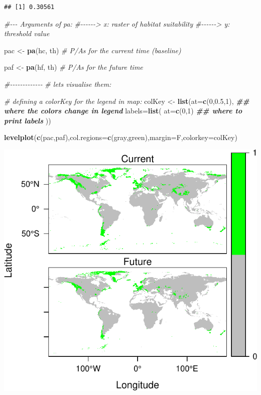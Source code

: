 \documentclass[
]{article}
\newenvironment{Shaded}{\begin{snugshade}}{\end{snugshade}}
\newcommand{\AttributeTok}[1]{\textcolor[rgb]{0.13,0.29,0.53}{#1}}
\newcommand{\CommentTok}[1]{\textcolor[rgb]{0.56,0.35,0.01}{\textit{#1}}}
\newcommand{\DecValTok}[1]{\textcolor[rgb]{0.00,0.00,0.81}{#1}}
\newcommand{\DocumentationTok}[1]{\textcolor[rgb]{0.56,0.35,0.01}{\textbf{\textit{#1}}}}
\newcommand{\FloatTok}[1]{\textcolor[rgb]{0.00,0.00,0.81}{#1}}
\newcommand{\FunctionTok}[1]{\textcolor[rgb]{0.13,0.29,0.53}{\textbf{#1}}}
\newcommand{\NormalTok}[1]{#1}
\newcommand{\OtherTok}[1]{\textcolor[rgb]{0.56,0.35,0.01}{#1}}
\newcommand{\StringTok}[1]{\textcolor[rgb]{0.31,0.60,0.02}{#1}}
\begin{document}
\begin{verbatim}
## [1] 0.30561
\end{verbatim}

\begin{Shaded}
\begin{Highlighting}[]
\CommentTok{\#{-}{-}{-} Arguments of pa:}
\CommentTok{\#{-}{-}{-}{-}{-}{-}\textgreater{} x: raster of habitat suitability}
\CommentTok{\#{-}{-}{-}{-}{-}{-}\textgreater{} y: threshold value}

\NormalTok{pac }\OtherTok{\textless{}{-}} \FunctionTok{pa}\NormalTok{(hc, th) }\CommentTok{\# P/As for the current time (baseline)}

\NormalTok{paf }\OtherTok{\textless{}{-}} \FunctionTok{pa}\NormalTok{(hf, th) }\CommentTok{\# P/As for the future time}

\CommentTok{\#{-}{-}{-}{-}{-}{-}{-}{-}{-}{-}{-}{-}{-}}
\CommentTok{\# let\textquotesingle{}s visualise them:}

\CommentTok{\# defining a colorKey for the legend in map:}
\NormalTok{colKey }\OtherTok{\textless{}{-}} \FunctionTok{list}\NormalTok{(}\AttributeTok{at=}\FunctionTok{c}\NormalTok{(}\DecValTok{0}\NormalTok{,}\FloatTok{0.5}\NormalTok{,}\DecValTok{1}\NormalTok{), }\DocumentationTok{\#\# where the colors change in legend}
                   \AttributeTok{labels=}\FunctionTok{list}\NormalTok{(}
                     \AttributeTok{at=}\FunctionTok{c}\NormalTok{(}\DecValTok{0}\NormalTok{,}\DecValTok{1}\NormalTok{) }\DocumentationTok{\#\# where to print labels}
\NormalTok{                   ))}

\FunctionTok{levelplot}\NormalTok{(}\FunctionTok{c}\NormalTok{(pac,paf),}\AttributeTok{col.regions=}\FunctionTok{c}\NormalTok{(}\StringTok{\textquotesingle{}gray\textquotesingle{}}\NormalTok{,}\StringTok{\textquotesingle{}green\textquotesingle{}}\NormalTok{),}\AttributeTok{margin=}\NormalTok{F,}\AttributeTok{colorkey=}\NormalTok{colKey)}
\end{Highlighting}
\end{Shaded}

\includegraphics{sdm_R_files/figure-latex/unnamed-chunk-11-7.pdf}
\end{document}
